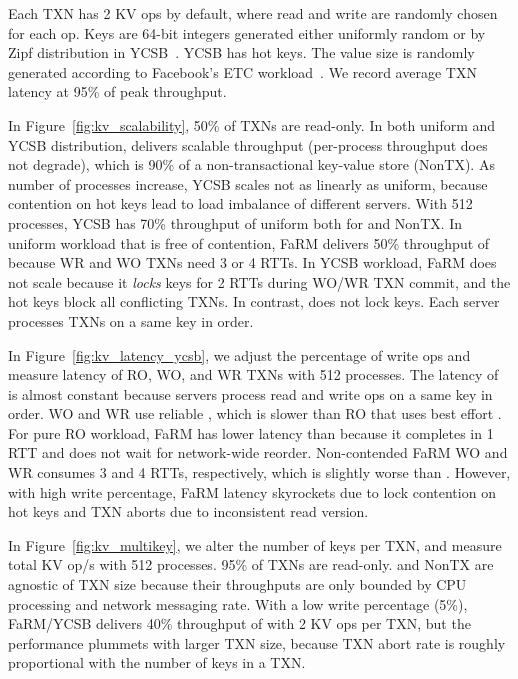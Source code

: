 Each TXN has 2 KV ops by default, where read and write are randomly chosen for each op.
Keys are 64-bit integers generated either uniformly random or by Zipf distribution in YCSB~\cite{cooper2010benchmarking}. YCSB has hot keys.
The value size is randomly generated according to Facebook's ETC workload~\cite{atikoglu2012workload}.
We record average TXN latency at 95\% of peak throughput.


In Figure~\ref{fig:kv_scalability}, 50\% of TXNs are read-only.
In both uniform and YCSB distribution, \sys{} delivers scalable throughput (per-process throughput does not degrade), which is 90\% of a non-transactional key-value store (NonTX).
As number of processes increase, YCSB scales not as linearly as uniform, because contention on hot keys lead to load imbalance of different servers.
With 512 processes, YCSB has 70\% throughput of uniform both for \sys{} and NonTX.
In uniform workload that is free of contention, FaRM delivers 50\% throughput of \sys{} because WR and WO TXNs need 3 or 4 RTTs.
In YCSB workload, FaRM does not scale because it \emph{locks} keys for 2 RTTs during WO/WR TXN commit, and the hot keys block all conflicting TXNs.
In contrast, \sys{} does not lock keys. Each server processes TXNs on a same key in order.

In Figure~\ref{fig:kv_latency_ycsb}, we adjust the percentage of write ops and measure latency of RO, WO, and WR TXNs with 512 processes.
The latency of \sys{} is almost constant because servers process read and write ops on a same key in order. WO and WR use reliable \sys{}, which is slower than RO that uses best effort \sys{}.
For pure RO workload, FaRM has lower latency than \sys{} because it completes in 1 RTT and does not wait for network-wide reorder.
Non-contended FaRM WO and WR consumes 3 and 4 RTTs, respectively, which is slightly worse than \sys{}.
However, with high write percentage, FaRM latency skyrockets due to lock contention on hot keys and TXN aborts due to inconsistent read version.

In Figure~\ref{fig:kv_multikey}, we alter the number of keys per TXN, and measure total KV op/s with 512 processes.
95\% of TXNs are read-only.
\sys{} and NonTX are agnostic of TXN size because their throughputs are only bounded by CPU processing and network messaging rate.
With a low write percentage (5\%), FaRM/YCSB delivers 40\% throughput of \sys{} with 2 KV ops per TXN, but the performance plummets with larger TXN size, because TXN abort rate is roughly proportional with the number of keys in a TXN.

